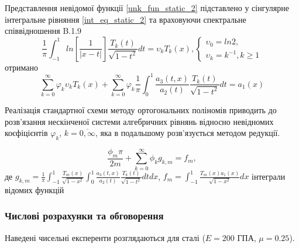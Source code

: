 Представлення невідомої функції \eqref{unk_fun_static_2} підставлено у сінгулярне інтегральне рівняння \eqref{int_eq_static_2}
та враховуючи спектральне співвідношення B.1.9 \cite{ortogonal}
\begin{equation}
    \frac{1}{\pi} \int_{-1}^{1} ln\left[ \frac{1}{\lvert x - t \rvert} \right] \frac{T_k(t)}{\sqrt{1 - t^2}} dt = \upsilon_k T_k(x),
    \begin{cases}
        \upsilon_0 = ln 2, \\
        \upsilon_k = k^{-1}, k \ge 1
    \end{cases}
\end{equation} 
отримано
\begin{equation}\label{int_eq_2_static_2}
    \sum_{k=0}^{\infty}  \varphi_k \upsilon_k T_{k}( x ) + \sum_{k=0}^{\infty} \varphi_k \frac{1}{\pi} \int_{0}^{1} \frac{a_3(t, x)}{a_2(t)} \frac{T_{k}(t)}{\sqrt{1 - t^2}} dt = a_1(x)
\end{equation}

Реалізація стандартної схеми методу ортогональних поліномів приводить до розв'язання нескінченої системи алгебричних рівнянь відносно невідномих коєфіцієнтів $\varphi_k$, $k=\overline{0, \infty}$,
яка в подальшому розв'язується методом редукції.

\begin{equation}\label{int_system_static_2}
    \frac{\phi_m \pi}{2m} + \sum_{k=0}^{\infty} \phi_k g_{k, m} = f_m,
\end{equation}
де $g_{k, m} = \frac{1}{\pi} \int_{-1}^{1} \frac{T_{m}(x)}{\sqrt{1 - x^2}} \int_{0}^{1} \frac{a_3(t, x )}{a_2(t)} \frac{T_{k}(t)}{\sqrt{1 - t^2}} dt dx$,
$f_m = \int_{-1}^{1} \frac{T_{m}(x) a_1(x)}{\sqrt{1 - x^2}} dx$ інтеграли відомих функцій

\subsubsection{Числові розрахунки та обговорення}
Наведені чисельні експеренти розглядаються для сталі ($E=200$ ГПА, $\mu=0.25$).

